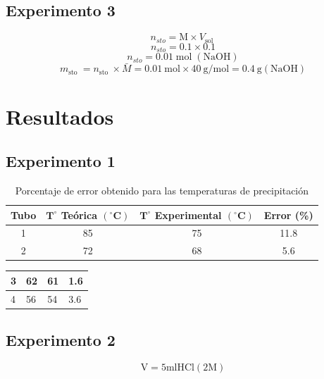 \documentclass[11pt]{scrartcl}
\begin{document}
\subsection{Experimento 3}
\[
 n_{s t o}=\mathrm{M} \times V_{\text {sol }} 
\] 
\[
n_{s t o}  =0.1 \times 0.1 
\]
\[
n_{s t o}  =0.01 \operatorname{mol}(\mathrm{NaOH}) 
\]
\[
m_{\text {sto }}  =n_{\text {sto }} \times \bar{M}=0.01 \mathrm{~mol} \times 40 \mathrm{~g} / \mathrm{mol}=0.4 \mathrm{~g}(\mathrm{NaOH})
\]

\section{Resultados}
\subsection{Experimento 1}
\begin{table}[H]
\caption{Porcentaje de error obtenido para las temperaturas de precipitación}
\begin{center}
\begin{tabular}{|c|c|c|c|}
\hline
Tubo & $\mathbf{T}^{\circ}$ Teórica $\left({ }^{\circ} \mathbf{C}\right)$ & $\mathbf{T}^{\circ}$ Experimental $\left({ }^{\circ} \mathbf{C}\right)$ & Error (\%) \\
\hline
1 & 85 & 75 & 11.8 \\
\hline
2 & 72 & 68 & 5.6 \\
\hline
\end{tabular}
\end{center}
\end{table}

\begin{center}
\begin{tabular}{|l|l|l|l|}
\hline
3 & 62 & 61 & 1.6 \\
\hline
4 & 56 & 54 & 3.6 \\
\hline
\end{tabular}
\end{center}

\subsection{Experimento 2}
\[
\mathrm{V}=5 \mathrm{ml} \mathrm{HCl}(2 \mathrm{M})
\]
\end{document}
